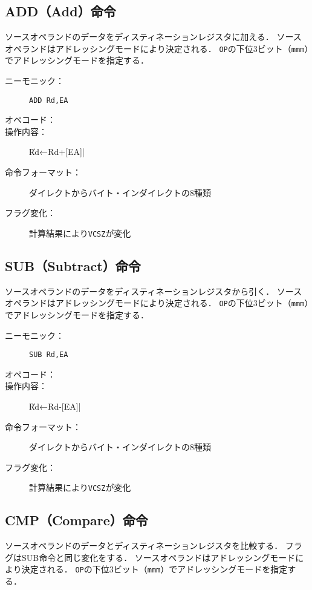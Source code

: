 \subsection{ADD（Add）命令}
ソースオペランドのデータをディスティネーションレジスタに加える．
ソースオペランドはアドレッシングモードにより決定される．
\texttt{OP}の下位3ビット（\texttt{mmm}）でアドレッシングモードを指定する．

\begin{description}
\item[ニーモニック：] \texttt{ADD Rd,EA}
\item[オペコード：] 
\item[操作内容：] \|Rd←Rd+[EA]|
\item[命令フォーマット：] ダイレクトからバイト・インダイレクトの8種類
\item[フラグ変化：] 計算結果により\texttt{VCSZ}が変化
\end{description}

\subsection{SUB（Subtract）命令}
ソースオペランドのデータをディスティネーションレジスタから引く．
ソースオペランドはアドレッシングモードにより決定される．
\texttt{OP}の下位3ビット（\texttt{mmm}）でアドレッシングモードを指定する．

\begin{description}
\item[ニーモニック：] \texttt{SUB Rd,EA}
\item[オペコード：] 
\item[操作内容：] \|Rd←Rd-[EA]|
\item[命令フォーマット：] ダイレクトからバイト・インダイレクトの8種類
\item[フラグ変化：] 計算結果により\texttt{VCSZ}が変化
\end{description}

\subsection{CMP（Compare）命令}
ソースオペランドのデータとディスティネーションレジスタを比較する．
フラグはSUB命令と同じ変化をする．
ソースオペランドはアドレッシングモードにより決定される．
\texttt{OP}の下位3ビット（\texttt{mmm}）でアドレッシングモードを指定する．

